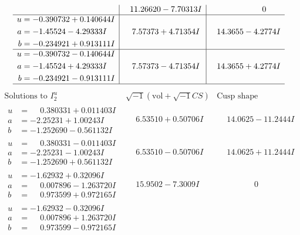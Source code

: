 \documentclass[1p]{elsarticle_modified}
\theoremstyle{definition}
\newcommand{\I}{\sqrt{-1}}
\begin{document}
$$\begin{array}{c|c|c}
 & \phantom{-}11.26620 - 7.70313 I & \phantom{-0.000000 } 0 \\ \hline\begin{aligned}
u &= -0.390732 + 0.140644 I \\
a &= -1.45524 - 4.29333 I \\
b &= -0.234921 + 0.913111 I\end{aligned}
 & \phantom{-}7.57373 + 4.71354 I & \phantom{-}14.3655 - 4.2774 I \\ \hline\begin{aligned}
u &= -0.390732 - 0.140644 I \\
a &= -1.45524 + 4.29333 I \\
b &= -0.234921 - 0.913111 I\end{aligned}
 & \phantom{-}7.57373 - 4.71354 I & \phantom{-}14.3655 + 4.2774 I\\
 \hline 
 \end{array}$$\newpage$$\begin{array}{c|c|c}  
\text{Solutions to }I^u_{2}& \I (\text{vol} + \sqrt{-1}CS) & \text{Cusp shape}\\
 \hline 
\begin{aligned}
u &= \phantom{-}0.380331 + 0.011403 I \\
a &= -2.25231 + 1.00243 I \\
b &= -1.252690 - 0.561132 I\end{aligned}
 & \phantom{-}6.53510 + 0.50706 I & \phantom{-}14.0625 - 11.2444 I \\ \hline\begin{aligned}
u &= \phantom{-}0.380331 - 0.011403 I \\
a &= -2.25231 - 1.00243 I \\
b &= -1.252690 + 0.561132 I\end{aligned}
 & \phantom{-}6.53510 - 0.50706 I & \phantom{-}14.0625 + 11.2444 I \\ \hline\begin{aligned}
u &= -1.62932 + 0.32096 I \\
a &= \phantom{-}0.007896 - 1.263720 I \\
b &= \phantom{-}0.973599 + 0.972165 I\end{aligned}
 & \phantom{-}15.9502 - 7.3009 I & \phantom{-0.000000 } 0 \\ \hline\begin{aligned}
u &= -1.62932 - 0.32096 I \\
a &= \phantom{-}0.007896 + 1.263720 I \\
b &= \phantom{-}0.973599 - 0.972165 I\end{aligned}

\end{array}$$
\end{document}
